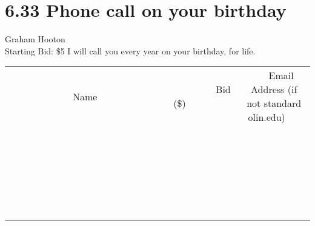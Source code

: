\documentclass[11pt]{article}
\begin{document}
\section*{6.33 Phone call on your birthday}
Graham Hooton
\\
Starting Bid: \$5
\newline
I will call you every year on your birthday, for life.
\\[6ex]
\begin{tabular}{c c c}
~~~~~~~~~~~~~Name~~~~~~~~~~~~~ & ~~~~~~~~~Bid (\$)~~~~~~~~~  & ~~~Email Address (if not standard olin.edu)~~~\\
 & & \\
\hline
 & & \\
\hline
 & & \\
\hline
 & & \\
\hline
 & & \\
\hline
 & & \\
\hline
 & & \\
\hline
 & & \\
\hline
 & & \\
\hline
 & & \\
\hline
 & & \\
\hline
 & & \\
\hline
 & & \\
\hline
 & & \\
\hline
 & & \\
\hline
 & & \\
\hline
 & & \\
\hline
 & & \\
\hline
 & & \\
\hline
 & & \\
\hline
 & & \\
\hline
 & & \\
\hline
 & & \\
\hline
 & & \\
\hline
 & & \\
\hline
 & & \\
\hline
\end{tabular}
\newpage
\end{document}
